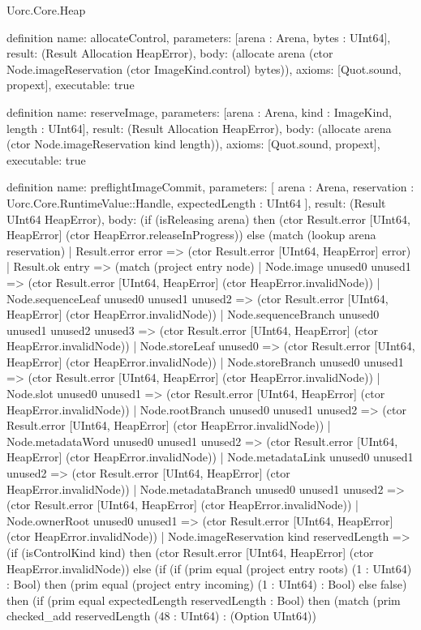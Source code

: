 \begin{lexlean}{Uorc.Core.Heap}
\begin{semanticmodule}
definition{
  name: allocateControl,
  parameters: [arena : Arena, bytes : UInt64],
  result: (Result Allocation HeapError),
  body: (allocate arena (ctor Node.imageReservation (ctor ImageKind.control) bytes)),
  axioms: [Quot.sound, propext],
  executable: true
}

definition{
  name: reserveImage,
  parameters: [arena : Arena, kind : ImageKind, length : UInt64],
  result: (Result Allocation HeapError),
  body: (allocate arena (ctor Node.imageReservation kind length)),
  axioms: [Quot.sound, propext],
  executable: true
}

definition{
  name: preflightImageCommit,
  parameters: [
    arena : Arena,
    reservation : Uorc.Core.RuntimeValue::Handle,
    expectedLength : UInt64
  ],
  result: (Result UInt64 HeapError),
  body: (if (isReleasing arena) then (ctor Result.error [UInt64, HeapError] (ctor HeapError.releaseInProgress)) else (match (lookup arena reservation)
    | Result.error error => (ctor Result.error [UInt64, HeapError] error)
    | Result.ok entry => (match (project entry node)
      | Node.image unused0 unused1 => (ctor Result.error [UInt64, HeapError] (ctor HeapError.invalidNode))
      | Node.sequenceLeaf unused0 unused1 unused2 => (ctor Result.error [UInt64, HeapError] (ctor HeapError.invalidNode))
      | Node.sequenceBranch unused0 unused1 unused2 unused3 => (ctor Result.error [UInt64, HeapError] (ctor HeapError.invalidNode))
      | Node.storeLeaf unused0 => (ctor Result.error [UInt64, HeapError] (ctor HeapError.invalidNode))
      | Node.storeBranch unused0 unused1 => (ctor Result.error [UInt64, HeapError] (ctor HeapError.invalidNode))
      | Node.slot unused0 unused1 => (ctor Result.error [UInt64, HeapError] (ctor HeapError.invalidNode))
      | Node.rootBranch unused0 unused1 unused2 => (ctor Result.error [UInt64, HeapError] (ctor HeapError.invalidNode))
      | Node.metadataWord unused0 unused1 unused2 => (ctor Result.error [UInt64, HeapError] (ctor HeapError.invalidNode))
      | Node.metadataLink unused0 unused1 unused2 => (ctor Result.error [UInt64, HeapError] (ctor HeapError.invalidNode))
      | Node.metadataBranch unused0 unused1 unused2 => (ctor Result.error [UInt64, HeapError] (ctor HeapError.invalidNode))
      | Node.ownerRoot unused0 unused1 => (ctor Result.error [UInt64, HeapError] (ctor HeapError.invalidNode))
      | Node.imageReservation kind reservedLength => (if (isControlKind kind) then (ctor Result.error [UInt64, HeapError] (ctor HeapError.invalidNode)) else (if (if (prim equal (project entry roots) (1 : UInt64) : Bool) then (prim equal (project entry incoming) (1 : UInt64) : Bool) else false) then (if (prim equal expectedLength reservedLength : Bool) then (match (prim checked_add reservedLength (48 : UInt64) : (Option UInt64))
}
\end{semanticmodule}
\end{lexlean}
